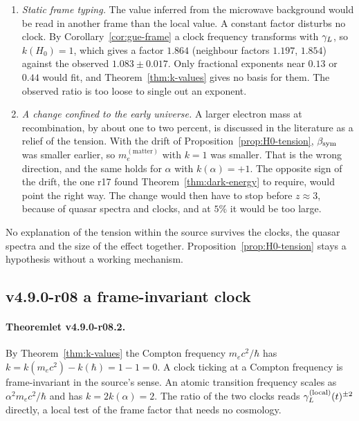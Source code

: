 \begin{enumerate}[leftmargin=2em]
\item \emph{Static frame typing.}  The value inferred from the microwave background would be read in another frame than
the local value.  A constant factor disturbs no clock.  By Corollary~\ref{cor:gue-frame} a clock frequency transforms with
\(\gamma_L\), so \(k(H_0)=1\), which gives a factor \(1.864\) (neighbour factors \(1.197\), \(1.854\)) against the observed
\(1.083\pm0.017\).  Only fractional exponents near \(0.13\) or \(0.44\) would fit, and Theorem~\ref{thm:k-values} gives no
basis for them.  The observed ratio is too loose to single out an exponent.
\item \emph{A change confined to the early universe.}  A larger electron mass at recombination, by about one to two
percent, is discussed in the literature as a relief of the tension.  With the drift of
Proposition~\ref{prop:H0-tension}, \(\beta_{\mathrm{sym}}\) was smaller earlier, so \(m_e^{(\mathrm{matter})}\) with \(k=1\) was smaller.
That is the wrong direction, and the same holds for \(\alpha\) with \(k(\alpha)=+1\).  The opposite sign of the drift, the one
r17 found Theorem~\ref{thm:dark-energy} to require, would point the right way.  The change would then have to stop before
\(z\approx3\), because of quasar spectra and clocks, and at \(5\%\) it would be too large.
\end{enumerate}
No explanation of the tension within the source survives the clocks, the quasar spectra and the size of the effect
together.  Proposition~\ref{prop:H0-tension} stays a hypothesis without a working mechanism.

\subsection*{v4.9.0-r08 a frame-invariant clock}
\label{subsec:v490-r08-compton}

\paragraph{Theoremlet v4.9.0-r08.2.}
By Theorem~\ref{thm:k-values} the Compton frequency \(m_ec^2/\hbar\) has \(k=k(m_ec^2)-k(\hbar)=1-1=0\).  A clock ticking
at a Compton frequency is frame-invariant in the source's sense.  An atomic transition frequency scales as
\(\alpha^2m_ec^2/\hbar\) and has \(k=2k(\alpha)=2\).  The ratio of the two clocks reads \(\gamma_L^{(\mathrm{local})}(t)^{\pm2}\)
directly, a local test of the frame factor that needs no cosmology.


